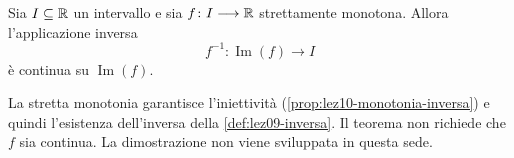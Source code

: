 \begin{theorem}
\label{thm:lez21-continuita-inversa}
Sia \(I\subseteq\mathbb{R}\) un intervallo e sia
\(f\colon I\longrightarrow\mathbb{R}\) strettamente monotona.
Allora l'applicazione inversa
\[
  f^{-1}\colon\operatorname{Im}(f)\longrightarrow I
\]
è continua su \(\operatorname{Im}(f)\).
\end{theorem}

La stretta monotonia garantisce l'iniettività
(\cref{prop:lez10-monotonia-inversa}) e quindi
l'esistenza dell'inversa della \cref{def:lez09-inversa}.
Il teorema non richiede che \(f\) sia continua.
La dimostrazione non viene sviluppata in questa sede.
